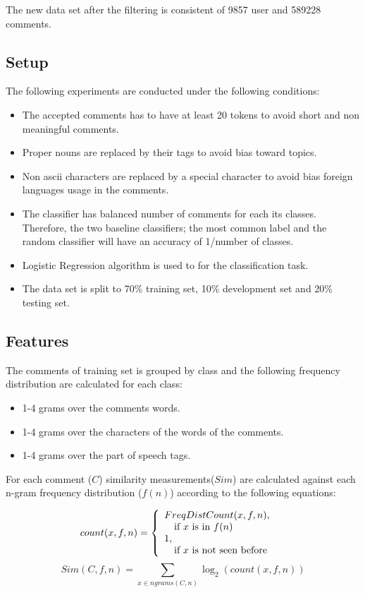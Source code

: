 \documentclass[11pt]{article}
\begin{document}
The new data set after the filtering is consistent of 9857 user and 589228 comments.

\subsection{Setup}
The following experiments are conducted under the following conditions:
\begin{itemize}
\item The accepted comments has to have at least 20 tokens to avoid short and non meaningful comments.
\item Proper nouns are replaced by their tags to avoid bias toward topics.
\item Non ascii characters are replaced by a special character to avoid bias foreign languages usage in the comments.
\item The classifier has balanced number of comments for each its classes. Therefore, the two baseline classifiers; the most common label and the random classifier will have an accuracy of 1/number of classes.
\item Logistic Regression algorithm is used to for the classification task.
\item The data set is split to 70\% training set, 10\% development set and 20\% testing set.
\end{itemize}

\subsection{Features}
The comments of training set is grouped by class and the following frequency distribution are calculated for each class:
\begin{itemize}
\item 1-4 grams over the comments words.
\item 1-4 grams over the characters of the words of the comments.
\item 1-4 grams over the part of speech tags.
\end{itemize}

For each comment ($C$) similarity measurements($Sim$) are calculated against each n-gram frequency distribution ($f(n)$) according to the following equations:

\[
  count(x, f, n) = \left\{ 
  \begin{array}{l l}
    FreqDistCount(x, f, n), & \\\quad \text{if $x$ is in $f(n)$}\\
    1,&\\\quad \text{if $x$ is not seen before}\\
  \end{array} \right.
\]
\[
  Sim(C,f,n) = \sum_{x \in ngrams(C,n)} \log_2 (count(x,f,n))
\]
\end{document}
